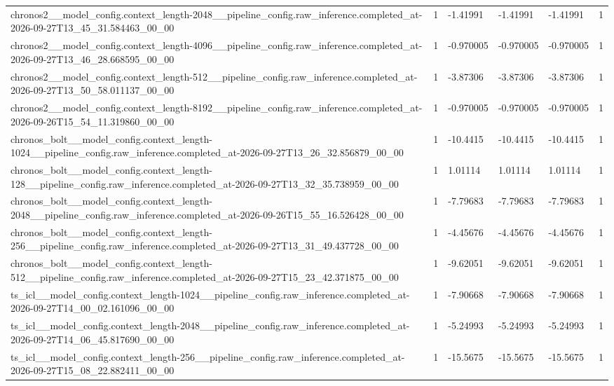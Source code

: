 \begin{tabular}{llllll}
chronos2\_\_model\_config.context\_length-2048\_\_pipeline\_config.raw\_inference.completed\_at-2026-09-27T13\_45\_31.584463\_00\_00 & 1 & -1.41991 & -1.41991 & -1.41991 & 1 \\
chronos2\_\_model\_config.context\_length-4096\_\_pipeline\_config.raw\_inference.completed\_at-2026-09-27T13\_46\_28.668595\_00\_00 & 1 & -0.970005 & -0.970005 & -0.970005 & 1 \\
chronos2\_\_model\_config.context\_length-512\_\_pipeline\_config.raw\_inference.completed\_at-2026-09-27T13\_50\_58.011137\_00\_00 & 1 & -3.87306 & -3.87306 & -3.87306 & 1 \\
chronos2\_\_model\_config.context\_length-8192\_\_pipeline\_config.raw\_inference.completed\_at-2026-09-26T15\_54\_11.319860\_00\_00 & 1 & -0.970005 & -0.970005 & -0.970005 & 1 \\
chronos\_bolt\_\_model\_config.context\_length-1024\_\_pipeline\_config.raw\_inference.completed\_at-2026-09-27T13\_26\_32.856879\_00\_00 & 1 & -10.4415 & -10.4415 & -10.4415 & 1 \\
chronos\_bolt\_\_model\_config.context\_length-128\_\_pipeline\_config.raw\_inference.completed\_at-2026-09-27T13\_32\_35.738959\_00\_00 & 1 & 1.01114 & 1.01114 & 1.01114 & 1 \\
chronos\_bolt\_\_model\_config.context\_length-2048\_\_pipeline\_config.raw\_inference.completed\_at-2026-09-26T15\_55\_16.526428\_00\_00 & 1 & -7.79683 & -7.79683 & -7.79683 & 1 \\
chronos\_bolt\_\_model\_config.context\_length-256\_\_pipeline\_config.raw\_inference.completed\_at-2026-09-27T13\_31\_49.437728\_00\_00 & 1 & -4.45676 & -4.45676 & -4.45676 & 1 \\
chronos\_bolt\_\_model\_config.context\_length-512\_\_pipeline\_config.raw\_inference.completed\_at-2026-09-27T15\_23\_42.371875\_00\_00 & 1 & -9.62051 & -9.62051 & -9.62051 & 1 \\
ts\_icl\_\_model\_config.context\_length-1024\_\_pipeline\_config.raw\_inference.completed\_at-2026-09-27T14\_00\_02.161096\_00\_00 & 1 & -7.90668 & -7.90668 & -7.90668 & 1 \\
ts\_icl\_\_model\_config.context\_length-2048\_\_pipeline\_config.raw\_inference.completed\_at-2026-09-27T14\_06\_45.817690\_00\_00 & 1 & -5.24993 & -5.24993 & -5.24993 & 1 \\
ts\_icl\_\_model\_config.context\_length-256\_\_pipeline\_config.raw\_inference.completed\_at-2026-09-27T15\_08\_22.882411\_00\_00 & 1 & -15.5675 & -15.5675 & -15.5675 & 1 \\

\end{tabular}
